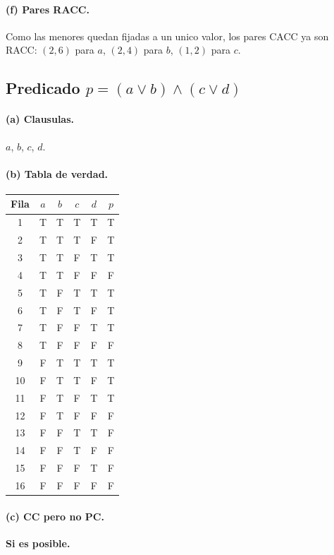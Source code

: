 \documentclass[12pt,a4paper]{article}
\begin{document}
\paragraph{(f) Pares RACC.} Como las menores quedan fijadas a un unico valor, los pares CACC ya
son RACC: $(2,6)$ para $a$, $(2,4)$ para $b$, $(1,2)$ para $c$.

\subsection{Predicado $p = (a \vee b) \wedge (c \vee d)$}

\paragraph{(a) Clausulas.} $a$, $b$, $c$, $d$.

\paragraph{(b) Tabla de verdad.}

\begin{center}
\begin{tabular}{cccccc}
\toprule
Fila & $a$ & $b$ & $c$ & $d$ & $p$ \\
\midrule
1  & T & T & T & T & T \\
2  & T & T & T & F & T \\
3  & T & T & F & T & T \\
4  & T & T & F & F & F \\
5  & T & F & T & T & T \\
6  & T & F & T & F & T \\
7  & T & F & F & T & T \\
8  & T & F & F & F & F \\
9  & F & T & T & T & T \\
10 & F & T & T & F & T \\
11 & F & T & F & T & T \\
12 & F & T & F & F & F \\
13 & F & F & T & T & F \\
14 & F & F & T & F & F \\
15 & F & F & F & T & F \\
16 & F & F & F & F & F \\
\bottomrule
\end{tabular}
\end{center}

\paragraph{(c) CC pero no PC.} \textbf{Si es posible.}
\end{document}
